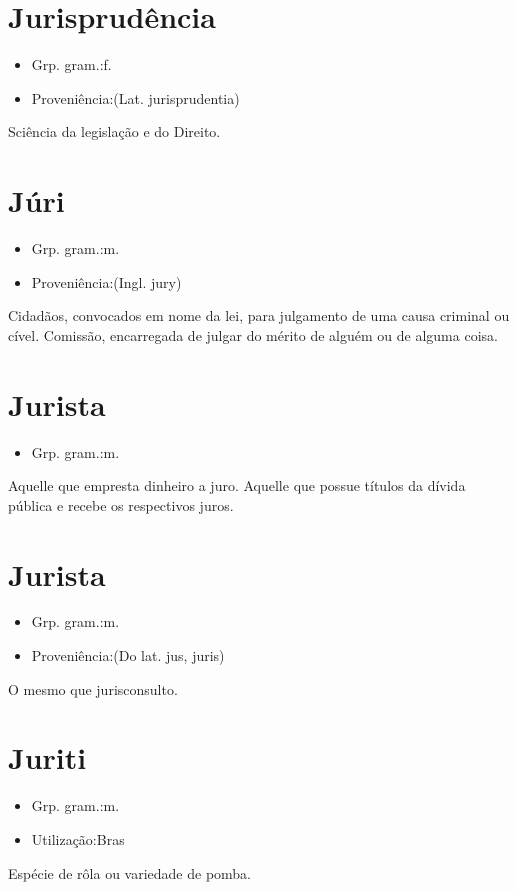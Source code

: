 \documentclass{article}
\begin{document}
\section{Jurisprudência}
\begin{itemize}
\item {Grp. gram.:f.}
\end{itemize}
\begin{itemize}
\item {Proveniência:(Lat. \textunderscore jurisprudentia\textunderscore )}
\end{itemize}
Sciência da legislação e do Direito.
\section{Júri}
\begin{itemize}
\item {Grp. gram.:m.}
\end{itemize}
\begin{itemize}
\item {Proveniência:(Ingl. \textunderscore jury\textunderscore )}
\end{itemize}
Cidadãos, convocados em nome da lei, para julgamento de uma causa criminal ou cível.
Comissão, encarregada de julgar do mérito de alguém ou de alguma coisa.
\section{Jurista}
\begin{itemize}
\item {Grp. gram.:m.}
\end{itemize}
Aquelle que empresta dinheiro a juro.
Aquelle que possue títulos da dívida pública e recebe os respectivos juros.
\section{Jurista}
\begin{itemize}
\item {Grp. gram.:m.}
\end{itemize}
\begin{itemize}
\item {Proveniência:(Do lat. \textunderscore jus\textunderscore , \textunderscore juris\textunderscore )}
\end{itemize}
O mesmo que \textunderscore jurisconsulto\textunderscore .
\section{Juriti}
\begin{itemize}
\item {Grp. gram.:m.}
\end{itemize}
\begin{itemize}
\item {Utilização:Bras}
\end{itemize}
Espécie de rôla ou variedade de pomba.
\end{document}
